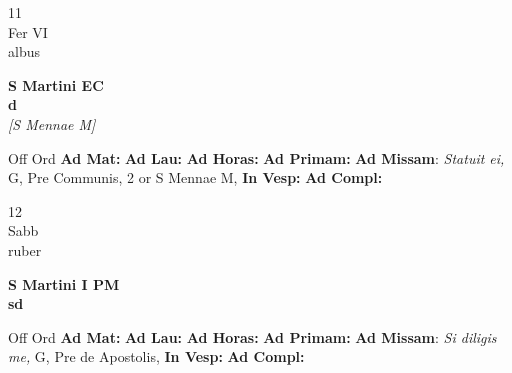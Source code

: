 \documentclass[10pt, openany]{book}
\begin{document}
    \begin{center}
        \begin{minipage}{3.5in}
            \vspace{2em}
            \begin{minipage}{0.5in}
                {\Huge 11} \\
                {\normalsize Fer VI} \\
                {\normalsize albus}
            \end{minipage}
            \begin{minipage}{3.0in}
                \textbf{ \large S Martini EC \\
                \textnormal{\normalsize d}} \\ \textit{[S Mennae M]} \\ 
            \end{minipage}
            \begin{justify}Off Ord
                \textbf{Ad Mat: }
                \textbf{Ad Lau: }
                \textbf{Ad Horas: }
                \textbf{Ad Primam: }\textbf{Ad Missam}: \textit{Statuit ei,} G, Pre Communis, 2 or S Mennae M,  
                \textbf{In Vesp: }
                \textbf{Ad Compl: }
            \end{justify}
        \end{minipage}
    \end{center}

    \begin{center}
        \begin{minipage}{3.5in}
            \vspace{2em}
            \begin{minipage}{0.5in}
                {\Huge 12} \\
                {\normalsize Sabb} \\
                {\normalsize ruber}
            \end{minipage}
            \begin{minipage}{3.0in}
                \textbf{ \large S Martini I PM \\
                \textnormal{\normalsize sd}} \\ 
            \end{minipage}
            \begin{justify}Off Ord
                \textbf{Ad Mat: }
                \textbf{Ad Lau: }
                \textbf{Ad Horas: }
                \textbf{Ad Primam: }\textbf{Ad Missam}: \textit{Si diligis me,} G, Pre de Apostolis,  
                \textbf{In Vesp: }
                \textbf{Ad Compl: }
            \end{justify}
        \end{minipage}
    \end{center}
\end{document}
